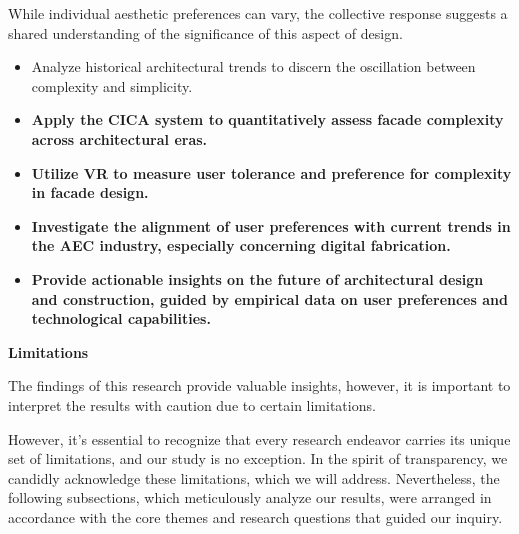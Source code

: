 
While individual aesthetic preferences can vary, the collective response suggests a shared understanding of the significance of this aspect of design.




\begin{itemize}
    \item Analyze historical architectural trends to discern the oscillation between complexity and simplicity.
    \item \textbf{Apply the CICA system to quantitatively assess facade complexity across architectural eras.}
    \item \textbf{Utilize VR to measure user tolerance and preference for complexity in facade design.}
    \item \textbf{Investigate the alignment of user preferences with current trends in the AEC industry, especially concerning digital fabrication.}
    \item \textbf{Provide actionable insights on the future of architectural design and construction, guided by empirical data on user preferences and technological capabilities.}
\end{itemize}



\textbf{Limitations}

The findings of this research provide valuable insights, however, it is important to interpret the results with caution due to certain limitations.

However, it's essential to recognize that every research endeavor carries its unique set of limitations, and our study is no exception.
In the spirit of transparency, we candidly acknowledge these limitations, which we will address.
Nevertheless, the following subsections, which meticulously analyze our results, were arranged in accordance with the core themes and research questions that guided our inquiry.

